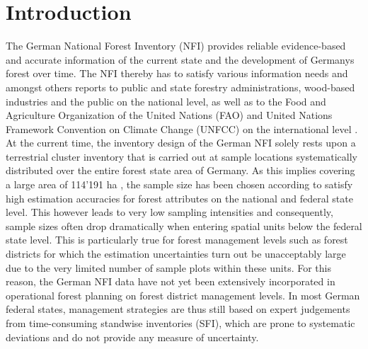 
\section{Introduction} %
\label{sec:intro}

The German National Forest Inventory (NFI) provides reliable evidence-based and accurate information of the current state and the development of Germanys forest over time. The NFI thereby has to satisfy various information needs and amongst others reports to public and state forestry administrations, wood-based industries and the public on the national level, as well as to the Food and Agriculture Organization of the United Nations (FAO) and United Nations Framework Convention on Climate Change (UNFCC) on the international level \citep{polley2010intomppo}. At the current time, the inventory design of the German NFI solely rests upon a terrestrial cluster inventory that is carried out at sample locations systematically distributed over the entire forest state area of Germany. As this implies covering a large area of 114'191 ha \citep{bwi3}, the sample size has been chosen according to satisfy high estimation accuracies for forest attributes on the national and federal state level. This however leads to very low sampling intensities and consequently, sample sizes often drop dramatically when entering spatial units below the federal state level. This is particularly true for forest management levels such as forest districts for which the estimation uncertainties turn out be unacceptably large due to the very limited number of sample plots within these units. For this reason, the German NFI data have not yet been extensively incorporated in operational forest planning on forest district management levels. In most German federal states, management strategies are thus still based on expert judgements from time-consuming standwise inventories (SFI), which are prone to systematic deviations \cite{kulievsis2016} and do not provide any measure of uncertainty.\par

